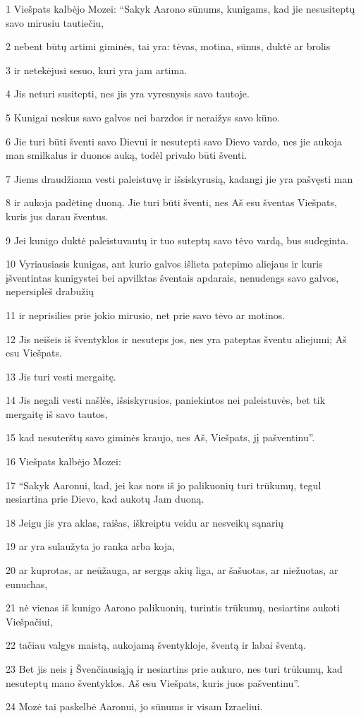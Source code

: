 \par 1 Viešpats kalbėjo Mozei: “Sakyk Aarono sūnums, kunigams, kad jie nesusiteptų savo mirusiu tautiečiu, 
\par 2 nebent būtų artimi giminės, tai yra: tėvas, motina, sūnus, duktė ar brolis 
\par 3 ir netekėjusi sesuo, kuri yra jam artima. 
\par 4 Jis neturi susitepti, nes jis yra vyresnysis savo tautoje. 
\par 5 Kunigai neskus savo galvos nei barzdos ir neraižys savo kūno. 
\par 6 Jie turi būti šventi savo Dievui ir nesutepti savo Dievo vardo, nes jie aukoja man smilkalus ir duonos auką, todėl privalo būti šventi. 
\par 7 Jiems draudžiama vesti paleistuvę ir išsiskyrusią, kadangi jie yra pašvęsti man 
\par 8 ir aukoja padėtinę duoną. Jie turi būti šventi, nes Aš esu šventas Viešpats, kuris jus darau šventus. 
\par 9 Jei kunigo duktė paleistuvautų ir tuo suteptų savo tėvo vardą, bus sudeginta. 
\par 10 Vyriausiasis kunigas, ant kurio galvos išlieta patepimo aliejaus ir kuris įšventintas kunigystei bei apvilktas šventais apdarais, nenudengs savo galvos, nepersiplėš drabužių 
\par 11 ir neprisilies prie jokio mirusio, net prie savo tėvo ar motinos. 
\par 12 Jis neišeis iš šventyklos ir nesuteps jos, nes yra pateptas šventu aliejumi; Aš esu Viešpats. 
\par 13 Jis turi vesti mergaitę. 
\par 14 Jis negali vesti našlės, išsiskyrusios, paniekintos nei paleistuvės, bet tik mergaitę iš savo tautos, 
\par 15 kad nesuterštų savo giminės kraujo, nes Aš, Viešpats, jį pašventinu”. 
\par 16 Viešpats kalbėjo Mozei: 
\par 17 “Sakyk Aaronui, kad, jei kas nors iš jo palikuonių turi trūkumų, tegul nesiartina prie Dievo, kad aukotų Jam duoną. 
\par 18 Jeigu jis yra aklas, raišas, iškreiptu veidu ar nesveikų sąnarių 
\par 19 ar yra sulaužyta jo ranka arba koja, 
\par 20 ar kuprotas, ar neūžauga, ar sergąs akių liga, ar šašuotas, ar niežuotas, ar eunuchas,­ 
\par 21 nė vienas iš kunigo Aarono palikuonių, turintis trūkumų, nesiartins aukoti Viešpačiui, 
\par 22 tačiau valgys maistą, aukojamą šventykloje, šventą ir labai šventą. 
\par 23 Bet jis neis į Švenčiausiąją ir nesiartins prie aukuro, nes turi trūkumų, kad nesuteptų mano šventyklos. Aš esu Viešpats, kuris juos pašventinu”. 
\par 24 Mozė tai paskelbė Aaronui, jo sūnums ir visam Izraeliui.



